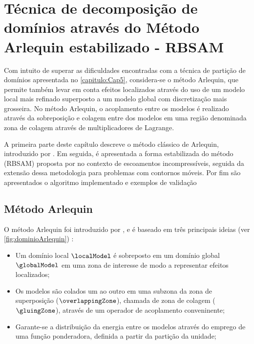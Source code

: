 \chapter[Método Arlequin estabilizado]{Técnica de decomposição de domínios através do Método Arlequin estabilizado - RBSAM} \label{capitulo:Cap6}

Com intuito de superar as dificuldades encontradas com a técnica de partição de domínios apresentada no \autoref{capitulo:Cap5}, considera-se o método Arlequin, que permite também levar em conta efeitos localizados através do uso de um modelo local mais refinado superposto a um modelo global com discretização mais grosseira. No método Arlequin, o acoplamento entre os modelos é realizado através da sobreposição e colagem entre dos modelos em uma região denominada zona de colagem através de multiplicadores de Lagrange.

A primeira parte deste capítulo descreve o método clássico de Arlequin, introduzido por . Em seguida, é apresentada a forma estabilizada do método (RBSAM) proposta por  no contexto de escoamentos incompressíveis, seguida da extensão dessa metodologia para problemas com contornos móveis. Por fim são apresentados o algoritmo implementado e exemplos de validação

\section{Método Arlequin}

O método Arlequin foi introduzido por , e é baseado em três principais ideias (ver \autoref{fig:dominioArlequin}) \cite{DhiaR:2005}:

\begin{itemize}
	\item Um domínio local $\localModel$ é sobreposto em um domínio global  $\globalModel$ em uma zona de interesse de modo a representar efeitos localizados;
	\item Os modelos são colados um ao outro em uma subzona da zona de superposição ($\overlappingZone$), chamada de zona de colagem ($\gluingZone$), através de um operador de acoplamento conveninente;
	\item  Garante-se a distribuição da energia entre os modelos através do emprego de uma função ponderadora, definida a partir da partição da unidade;
\end{itemize}

